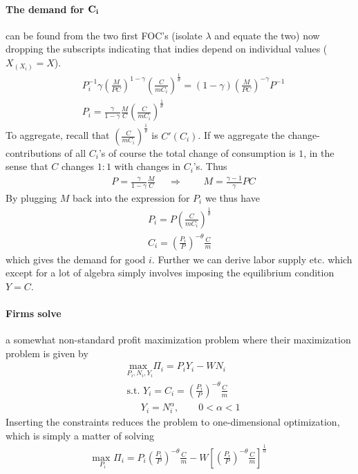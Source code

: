 \documentclass[12pt, a4paper]{article}
\begin{document}
\begin{spacing}{1.213}
\paragraph{The demand for $\bf C_i$}can be found from the two first FOC's (isolate $\lambda$ and equate the two) now dropping the subscripts indicating that indies depend on individual values ($X_{(X_i)}=X$).
\begin{align*}
&P_i^{-1}\gamma \left( \frac{M}{PC}\right)^{1- \gamma} \left(\frac{C}{m C_i}\right)^{\frac{1}{\theta}} = (1-\gamma)\left( \frac{M}{PC}\right)^{-\gamma} P^{-1} \\
& P_i = \frac{\gamma}{1-\gamma} \frac{M}{C} \left(\frac{C}{m C_i}\right)^{\frac{1}{\theta}}
\end{align*}
To aggregate, recall that $\left( \frac{C}{mC_i}\right)^{\frac{1}{\theta}}$ is $C'(C_i)$. If we aggregate the change-contributions of all $C_i$'s of course the total change of consumption is $1$, in the sense that $C$ changes $1:1$ with changes in $C_i$'s. Thus 
\begin{align*}
&P = \frac{\gamma}{1-\gamma}\frac{M}{C} && \Rightarrow &&& M= \frac{\gamma-1}{\gamma} PC 
\end{align*}
By plugging $M$ back into the expression for $P_i$ we thus have 
\begin{align*}
P_i = P \left( \frac{C}{mC_i} \right)^{\frac{1}{\theta}} \\
C_i = \left( \frac{P_i}{P} \right)^{-\theta} \frac{C}{m}
\end{align*}
which gives the demand for good $i$. Further we can derive labor supply etc. which except for a lot of algebra simply involves imposing the equilibrium condition $Y=C$. 

\paragraph{Firms solve} a somewhat non-standard profit maximization problem where their maximization problem is given by 
\begin{align*}
&\underset{P_i, N_i, Y_i}{\text{max }} \Pi_i = P_i Y_i - W N_i \\
&\textrm{s.t. } Y_i = C_i = \left( \frac{P_i}{P} \right)^{-\theta} \frac{C}{m} \\
& \ \   \quad Y_i = N_i^{\alpha}, \qquad 0 < \alpha < 1 
\end{align*}
Inserting the constraints reduces the problem to one-dimensional optimization, which is simply a matter of solving
\begin{align*}
\underset{P_i}{\text{max }} \Pi_i = P_i\left( \frac{P_i}{P} \right)^{-\theta} \frac{C}{m} - W \left[ \left( \frac{P_i}{P} \right)^{-\theta} \frac{C}{m} \right]^{\frac{1}{\alpha}}
\end{align*}


\end{spacing}
\end{document}
